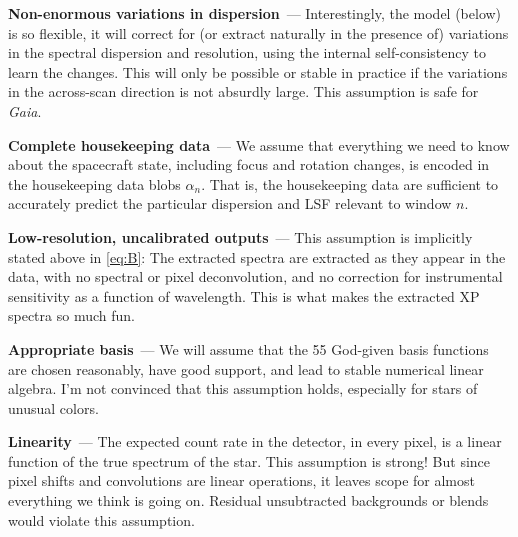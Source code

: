 \documentclass[11pt]{article}
\renewcommand{\paragraph}[1]{\medskip\par\noindent\textbf{#1}~---}
\begin{document}
\paragraph{Non-enormous variations in dispersion}
Interestingly, the model (below) is so flexible, it will correct for (or extract naturally in the presence of) variations in the spectral dispersion and resolution, using the internal self-consistency to learn the changes.
This will only be possible or stable in practice if the variations in the across-scan direction is not absurdly large.
This assumption is safe for \textsl{Gaia}.

\paragraph{Complete housekeeping data}
We assume that everything we need to know about the spacecraft state, including focus and rotation changes, is encoded in the housekeeping data blobs $\alpha_n$.
That is, the housekeeping data are sufficient to accurately predict the particular dispersion and LSF relevant to window $n$.

\paragraph{Low-resolution, uncalibrated outputs}
This assumption is implicitly stated above in \eqref{eq:B}:
The extracted spectra are extracted as they appear in the data, with no spectral or pixel deconvolution, and no correction for instrumental sensitivity as a function of wavelength.
This is what makes the extracted XP spectra so much fun.

\paragraph{Appropriate basis}
We will assume that the 55 God-given basis functions are chosen reasonably, have good support, and lead to stable numerical linear algebra.
I'm not convinced that this assumption holds, especially for stars of unusual colors.

\paragraph{Linearity}
The expected count rate in the detector, in every pixel, is a linear function of the true spectrum of the star.
This assumption is strong!
But since pixel shifts and convolutions are linear operations, it leaves scope for almost everything we think is going on.
Residual unsubtracted backgrounds or blends would violate this assumption.
\end{document}
